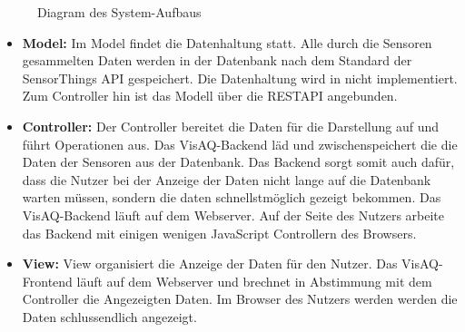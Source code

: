 \begin{figure}
    \caption{Diagram des System-Aufbaus}
\end{figure}
\begin{itemize}
    \item \textbf{Model:} Im Model findet die Datenhaltung statt. Alle durch die Sensoren gesammelten Daten werden in der Datenbank nach dem Standard der \gls{SensorThings API} gespeichert. Die Datenhaltung wird in \softwarename nicht implementiert.
        Zum Controller hin ist das Modell über die \gls{RESTAPI} angebunden.
    \item \textbf{Controller:} Der Controller bereitet die Daten für die Darstellung auf und führt Operationen aus.
        Das VisAQ-Backend läd und zwischenspeichert die die Daten der Sensoren aus der Datenbank. Das Backend sorgt somit auch dafür, dass die Nutzer bei der Anzeige der Daten nicht lange auf die Datenbank warten müssen, sondern die daten schnellstmöglich gezeigt bekommen.
        Das VisAQ-Backend läuft auf dem Webserver. Auf der Seite des Nutzers arbeite das Backend mit einigen wenigen \gls{JavaScript} Controllern des Browsers.
    \item \textbf{View:} View organisiert die Anzeige der Daten für den Nutzer.
        Das VisAQ-Frontend läuft auf dem Webserver und brechnet in Abstimmung mit dem Controller die Angezeigten Daten.
        Im Browser des Nutzers werden werden die Daten schlussendlich angezeigt.
\end{itemize}